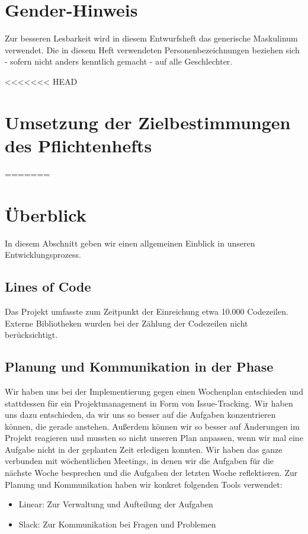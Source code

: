 \documentclass{implementierungsheft}
\begin{document}

\maketitle
\tableofcontents
\newpage

\section*{Gender-Hinweis}
Zur besseren Lesbarkeit wird in diesem Entwurfsheft das generische Maskulinum verwendet.
Die in diesem Heft verwendeten Personenbezeichnungen beziehen sich - sofern nicht anders kenntlich gemacht - auf alle Geschlechter.
\newpage

<<<<<<< HEAD
\section{Umsetzung der Zielbestimmungen des Pflichtenhefts}
=======
\section{Überblick}
In diesem Abschnitt geben wir einen allgemeinen Einblick in unseren Entwicklungsprozess.

\subsection{Lines of Code}
Das Projekt umfasste zum Zeitpunkt der Einreichung etwa 10.000 Codezeilen. Externe Bibliotheken wurden bei der Zählung der Codezeilen nicht berücksichtigt. 
\subsection{Planung und Kommunikation in der Phase}
Wir haben uns bei der Implementierung gegen einen Wochenplan entschieden und stattdessen für ein Projektmanagement in Form von Issue-Tracking.
Wir haben uns dazu entschieden, da wir uns so besser auf die Aufgaben konzentrieren können, die gerade anstehen.
Außerdem können wir so besser auf Änderungen im Projekt reagieren und mussten so nicht unseren Plan anpassen, wenn wir mal eine Aufgabe nicht in der geplanten Zeit erledigen konnten.
Wir haben das ganze verbunden mit wöchentlichen Meetings, in denen wir die Aufgaben für die nächste Woche besprechen und die Aufgaben der letzten Woche reflektieren.
Zur Planung und Kommunikation haben wir konkret folgenden Tools verwendet:
\begin{itemize}
    \item Linear: Zur Verwaltung und Aufteilung der Aufgaben
    \item Slack: Zur Kommunikation bei Fragen und Problemen
\end{itemize}
\end{document}
